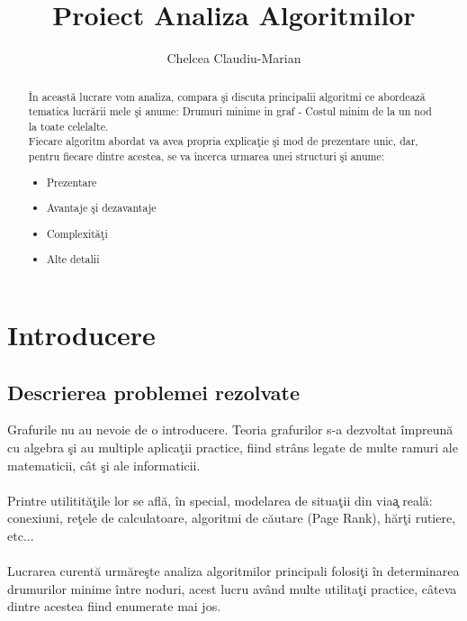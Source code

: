 \documentclass[runningheads]{llncs}
\title{Proiect Analiza Algoritmilor}
\author{Chelcea Claudiu-Marian\orcidID{322CA}}
\institute{Universitatea Politehnica din Bucure\c{s}ti\\Facultatea de Automatic\u{a} \c{s}i Calculatoare\\ \email{claudiuchelcea01@gmail.com}}
\begin{document}
\maketitle             

\begin{abstract}
\^{I}n aceast\u{a} lucrare vom analiza, compara \c{s}i discuta principalii algoritmi ce abordeaz\u{a} tematica lucr\u{a}rii mele \c{s}i anume: Drumuri minime in graf - Costul minim de la un nod la toate celelalte. \\

Fiecare algoritm abordat va avea propria explica\c{t}ie \c{s}i mod de prezentare unic, dar, pentru fiecare dintre acestea, se va \^{i}ncerca urmarea unei structuri \c{s}i anume: \\

\begin{itemize}
	\item Prezentare
	\item Avantaje \c{s}i dezavantaje
	\item Complexit\u{a}\c{t}i
	\item Alte detalii
\end{itemize}

\end{abstract}
%
%
%
%
%
\section{Introducere}
\subsection{Descrierea problemei rezolvate}
\hspace{6pt}Grafurile nu au nevoie de o introducere. Teoria grafurilor s-a dezvoltat \^{i}mpreun\u{a} cu algebra \c{s}i au multiple aplicaţii practice, fiind strâns legate de multe ramuri ale matematicii, c\^{a}t \c{s}i ale informaticii. 
\paragraph{} Printre utilitit\u{a}\c{t}ile lor se afl\u{a}, \^{i}n special, modelarea de situa\c{t}ii din via\c{a} real\u{a}: conexiuni, re\c{t}ele de calculatoare, algoritmi de c\u{a}utare (Page Rank), h\u{a}r\c{t}i rutiere, etc... 

\paragraph{} Lucrarea curent\u{a} urm\u{a}re\c{s}te analiza algoritmilor principali folosi\c{t}i \^{i}n determinarea drumurilor minime \^{i}ntre noduri, acest lucru av\^{a}nd multe utilita\c{t}i practice, c\^{a}teva dintre acestea fiind enumerate mai jos.
\end{document}
